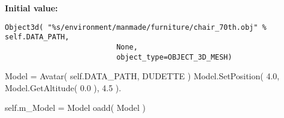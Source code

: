\textbf{Initial value:}

\begin{Code}\begin{verbatim}Object3d( "%s/environment/manmade/furniture/chair_70th.obj" % self.DATA_PATH, 
                          None, 
                          object_type=OBJECT_3D_MESH)
\end{verbatim}
\end{Code}
Model = Avatar( self.DATA\_\-PATH, DUDETTE ) Model.SetPosition( 4.0, Model.GetAltitude( 0.0 ), 4.5 ). 

self.m\_\-Model = Model oadd( Model ) 